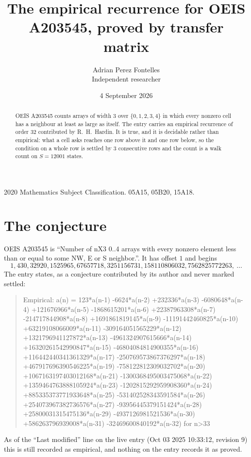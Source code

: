\documentclass[11pt,a4paper]{article}
\title{The empirical recurrence for OEIS A203545, proved by transfer matrix}
\author{Adrian Perez Fontelles\\ \small Independent researcher}
\date{4 September 2026}
\theoremstyle{plain}
\theoremstyle{definition}
\begin{document}
\maketitle

\begin{abstract}
OEIS A203545 counts arrays of width $3$ over $\{0,1,2,3,4\}$ in which every nonzero cell has a neighbour at least as large as itself. The entry carries an
empirical recurrence of order $32$ contributed by R.~H.~Hardin. It is true, and it is
decidable rather than empirical: what a cell asks reaches one row above it and one row below, so the
condition on a whole row is settled by $3$ consecutive rows and the count is a walk
count on $S=12001$ states.
\end{abstract}

\noindent\small 2020 Mathematics Subject Classification. 05A15, 05B20, 15A18.\normalsize

\section{The conjecture}

OEIS A203545 is ``Number of nX3 0..4 arrays with every nonzero element less than or equal to some NW, E or S neighbor.''. It has offset $1$ and begins
\[
1, 430, 32920, 1525965, 67657718, 3251156731, 158110806032, 7562825772263,\ \dots
\]
The entry states, as a conjecture contributed by its author and never marked settled:
\begin{quote}
Empirical: a(n) = 123*a(n-1) -6624*a(n-2) +232336*a(n-3) -6080648*a(n-4) +121676966*a(n-5) -1868615201*a(n-6) +22387963308*a(n-7) -214717844908*a(n-8) +1691861819145*a(n-9) -11191442460825*a(n-10) +63219108066009*a(n-11) -309164051565229*a(n-12) +1321796941127872*a(n-13) -4961324907615666*a(n-14) +16320261542990847*a(n-15) -46804084814900355*a(n-16) +116442440341361329*a(n-17) -250769573867376297*a(n-18) +467917696390546225*a(n-19) -758122812309032702*a(n-20) +1067163197403012168*a(n-21) -1300368495003475068*a(n-22) +1359464763888105924*a(n-23) -1202815292959908360*a(n-24) +885335373771933648*a(n-25) -531402528343591584*a(n-26) +254073967382736576*a(n-27) -93956445379151424*a(n-28) +25800031315475136*a(n-29) -4937126981521536*a(n-30) +586263796939008*a(n-31) -32469600840192*a(n-32) for n>33
\end{quote}
As of the ``Last modified'' line on the live entry (Oct 03 2025 10:33:12, revision 9) this is still
recorded as empirical, and nothing on the entry records it as proved.
\end{document}
